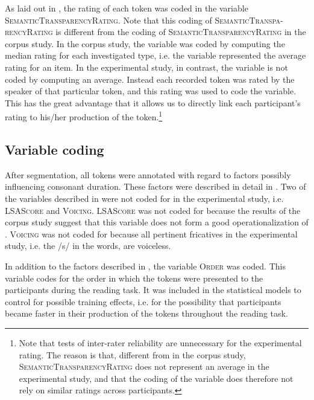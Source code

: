  As laid out in , the rating of each token was coded in the variable  \textsc{SemanticTransparencyRating}. Note that this coding of \textsc{SemanticTranspa-rencyRating} is different from the coding of \textsc{SemanticTransparencyRating} in the corpus study. In the corpus study, the variable was coded by computing the median rating for each investigated type, i.e. the variable represented the average rating for an item. 
 In the experimental study, in contrast, the variable is not coded by computing an average. Instead each recorded token 
 was rated by the speaker of that particular token, and this rating was used to code the variable.
 This has the great advantage that it allows us to directly link each participant's rating to his/her production of the token.\footnote{Note that tests of inter-rater reliability are unnecessary for the experimental rating. The reason is that, different from in the corpus study, \textsc{SemanticTransparencyRating} does not represent an average in the experimental study, and that the coding of the variable does therefore not rely on similar ratings across participants.} 
 \vspace{-0.3cm}



\subsection{Variable coding} \label{variable coding experiment}
 


After segmentation, all tokens were annotated with regard to factors possibly influencing consonant duration. These factors were described in detail in . 
Two of the variables described in  were not coded for in the experimental study, i.e. \textsc{LSAScore} and \textsc{Voicing}. 
\textsc{LSAScore} was not coded for because the results of the corpus study suggest that this variable does not form a good operationalization of . 
\textsc{Voicing} was not coded for because all pertinent fricatives in the experimental study, i.e. the /s/ in the words, are voiceless.

In addition to the factors described in , the variable \textsc{Order} was coded. This variable codes for the order in which the tokens were presented to the participants during the reading task. It was included in the statistical models to control for possible training effects, i.e. for the possibility that participants became faster in their production of the tokens throughout the reading task.

